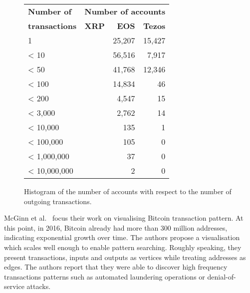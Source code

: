 \begin{figure}[tb]
	\footnotesize
	\centering
	\setlength{\tabcolsep}{16pt}
	\begin{tabular}{l r r r}
		\toprule
		\textbf{Number of}    & \multicolumn{3}{l}{\textbf{Number of accounts}}                                 \\
		\textbf{transactions} & \textbf{XRP}                                    & \textbf{EOS} & \textbf{Tezos} \\
		\midrule
		1                     &                                                 & 25,207       & 15,427         \\
		< 10                  &                                                 & 56,516       & 7,917          \\
		<  50                 &                                                 & 41,768       & 12,346         \\
		<  100                &                                                 & 14,834       & 46             \\
		<  200                &                                                 & 4,547        & 15             \\
		< 3,000               &                                                 & 2,762        & 14             \\
		< 10,000              &                                                 & 135          & 1              \\
		< 100,000             &                                                 & 105          & 0              \\
		< 1,000,000           &                                                 & 37           & 0              \\
		< 10,000,000          &                                                 & 2            & 0              \\
		\bottomrule
	\end{tabular}
	\caption{Histogram of the number of accounts with respect to the number of outgoing transactions.}
	\label{tab:tx-count-histogram}
\end{figure}



McGinn et al.~\cite{mcginn2016visualizing} focus their work on visualising Bitcoin transaction pattern. At this point, in 2016, Bitcoin already had more than 300 million addresses, indicating exponential growth over time. The authors propose a visualisation which scales well enough to enable pattern searching. Roughly speaking, they present transactions, inputs and outputs as vertices while treating addresses as edges. The authors report that they were able to discover high frequency transactions patterns such as automated laundering operations or denial-of-service attacks.

